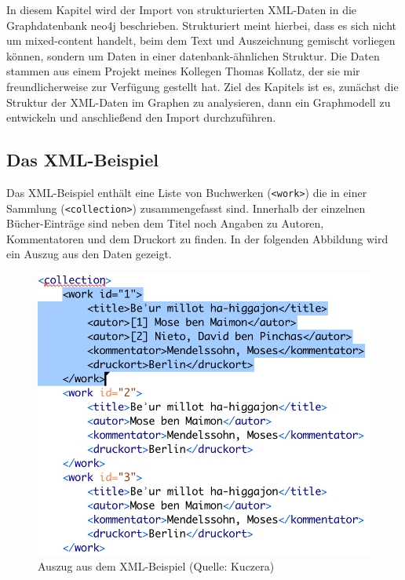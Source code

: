 \documentclass[12pt,ngerman,]{article}
\begin{document}
In diesem Kapitel wird der Import von strukturierten XML-Daten in die
Graphdatenbank neo4j beschrieben. Strukturiert meint hierbei, dass es
sich nicht um mixed-content handelt, beim dem Text und Auszeichnung
gemischt vorliegen können, sondern um Daten in einer datenbank-ähnlichen
Struktur. Die Daten stammen aus einem Projekt meines Kollegen Thomas
Kollatz, der sie mir freundlicherweise zur Verfügung gestellt hat. Ziel
des Kapitels ist es, zunächst die Struktur der XML-Daten im Graphen zu
analysieren, dann ein Graphmodell zu entwickeln und anschließend den
Import durchzuführen.

\subsection{Das XML-Beispiel}\label{das-xml-beispiel}

Das XML-Beispiel enthält eine Liste von Buchwerken
(\texttt{\textless{}work\textgreater{}}) die in einer Sammlung
(\texttt{\textless{}collection\textgreater{}}) zusammengefasst sind.
Innerhalb der einzelnen Bücher-Einträge sind neben dem Titel noch
Angaben zu Autoren, Kommentatoren und dem Druckort zu finden. In der
folgenden Abbildung wird ein Auszug aus den Daten gezeigt.

\begin{figure}
\centering
\includegraphics{./Bilder/kollatz-xml-Beispiel.png}
\caption{Auszug aus dem XML-Beispiel (Quelle: Kuczera)}
\end{figure}
\end{document}
